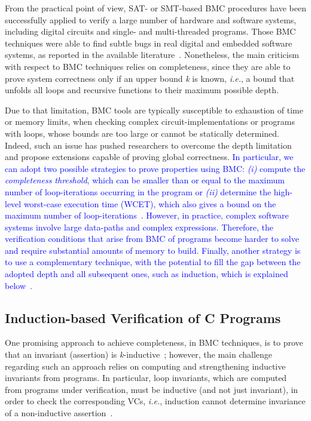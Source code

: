 \documentclass{cta-author}
\begin{document}
From the practical point of view, SAT- or SMT-based BMC procedures have been successfully applied to verify a large number of hardware and software systems, including digital circuits and single- and multi-threaded programs. Those BMC techniques were able to find subtle bugs in real digital and embedded software systems, as reported in the available literature~\cite{Clarke04,MerzFS12,CordeiroF11,Ivancic05,Cordeiro12}. Nonetheless, the main criticism with respect to BMC techniques relies on completeness, since they are able to prove system correctness only if an upper bound \textit{k} is known, {\it i.e.}, a bound that unfolds all loops and recursive functions to their maximum possible depth. 

Due to that limitation, BMC tools are typically susceptible to exhaustion of time or memory limits, when checking complex circuit-implementations or programs with loops, whose bounds are too large or cannot be statically determined. Indeed, such an issue has pushed researchers to overcome the depth limitation and propose extensions capable of proving global correctness. \textcolor{blue}{In particular, we can adopt two possible strategies to prove properties using BMC: \textit{(i)} compute the \textit{completeness threshold}, which can be smaller than or equal to the maximum number of loop-iterations occurring in the program or \textit{(ii)} determine the high-level worst-case execution time (WCET), which also gives a bound on the maximum number of loop-iterations~\cite{handbook09,ckso04,Ganai08}. However, in practice, complex software systems involve large data-paths and complex expressions. Therefore, the verification conditions that arise from BMC of programs become harder to solve and require substantial amounts of memory to build. Finally, another strategy is to use a complementary technique, with the potential to fill the gap between the adopted depth and all subsequent ones, such as induction, which is explained below~\cite{EenS03,Sheera00}.}

\subsection{Induction-based Verification of C Programs}

One promising approach to achieve completeness, in BMC techniques, is to prove that an invariant (assertion) is \textit{k}-inductive~\cite{EenS03,Sheera00}; however, the main challenge regarding such an approach relies on computing and strengthening inductive invariants from programs. In particular, loop invariants, which are computed from programs under verification, must be inductive (and not just invariant), in order to check the corresponding VCs, {\it i.e.}, induction cannot determine invariance of a non-inductive assertion~\cite{Bradley07}. 
\end{document}
